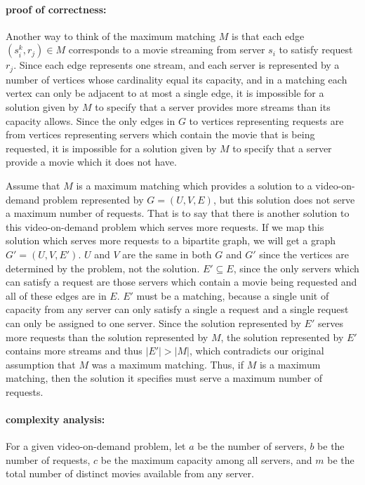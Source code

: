 \documentclass{article}
\begin{document}
\begin{enumerate}
\paragraph{proof of correctness:} Another way to think of the maximum matching $M$ is that each edge $(s_i^k, r_j) \in M$ corresponds to a movie streaming from server $s_i$ to satisfy request $r_j$. Since each edge represents one stream, and each server is represented by a number of vertices whose cardinality equal its capacity, and in a matching each vertex can only be adjacent to at most a single edge, it is impossible for a solution given by $M$ to specify that a server provides more streams than its capacity allows.  Since the only edges in $G$ to vertices representing requests are from vertices representing servers which contain the movie that is being requested, it is impossible for a solution given by $M$ to specify that a server provide a movie which it does not have.

\par Assume that $M$ is a maximum matching which provides a solution to a video-on-demand problem represented by $G = (U,V,E)$, but this solution does not serve a maximum number of requests.  That is to say that there is another solution to this video-on-demand problem which serves more requests. If we map this solution which serves more requests to a bipartite graph, we will get a graph $G' = (U,V,E')$. $U$ and $V$ are the same in both $G$ and $G'$ since the vertices are determined by the problem, not the solution.  $E' \subseteq E$, since the only servers which can satisfy a request are those servers which contain a movie being requested and all of these edges are in $E$. $E'$ must be a matching, because a single unit of capacity from any server can only satisfy a single a request and a single request can only be assigned to one server. Since the solution represented by $E'$ serves more requests than the solution represented by $M$, the solution represented by $E'$ contains more streams and thus $|E'| \gt |M|$, which contradicts our original assumption that $M$ was a maximum matching. Thus, if $M$ is a maximum matching, then the solution it specifies must serve a maximum number of requests.

\paragraph{complexity analysis:} For a given video-on-demand problem, let $a$ be the number of servers, $b$ be the number of requests, $c$ be the maximum capacity among all servers, and $m$ be the total number of distinct movies available from any server.


\end{enumerate}
\end{document}
